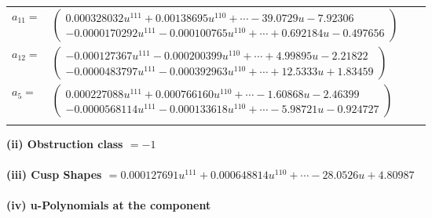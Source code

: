 \documentclass[1p]{elsarticle_modified}
\theoremstyle{definition}
\begin{document}
\begin{tabular}{m{7pt} m{180pt} m{7pt} m{180pt} }
\flushright $a_{11}=$&$\begin{pmatrix}0.000328032 u^{111}+0.00138695 u^{110}+\cdots-39.0729 u-7.92306\\-0.0000170292 u^{111}-0.000100765 u^{110}+\cdots+0.692184 u-0.497656\end{pmatrix}$ \\
\flushright $a_{12}=$&$\begin{pmatrix}-0.000127367 u^{111}-0.000200399 u^{110}+\cdots+4.99895 u-2.21822\\-0.0000483797 u^{111}-0.000392963 u^{110}+\cdots+12.5333 u+1.83459\end{pmatrix}$ \\
\flushright $a_{5}=$&$\begin{pmatrix}0.000227088 u^{111}+0.000766160 u^{110}+\cdots-1.60868 u-2.46399\\-0.0000568114 u^{111}-0.000133618 u^{110}+\cdots-5.98721 u-0.924727\end{pmatrix}$\\&\end{tabular}
\flushleft \textbf{(ii) Obstruction class $= -1$}\\~\\
\flushleft \textbf{(iii) Cusp Shapes $= 0.000127691 u^{111}+0.000648814 u^{110}+\cdots-28.0526 u+4.80987$}\\~\\
\newpage\renewcommand{\arraystretch}{1}
\flushleft \textbf{(iv) u-Polynomials at the component}\newline \\
\end{document}
